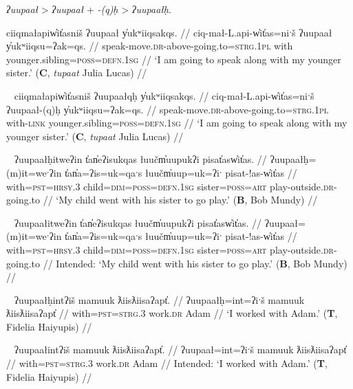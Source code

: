 \textit{ʔuupaał} > \textit{ʔuupaał} + \textit{-(q)ḥ} > \textit{ʔuupaałḥ}.

\ex \label{ex:uupaal1}
\begingl
\glpreamble ciiqmałapiw̓it̓asniš ʔuupaał y̓ukʷiiqsakqs. //
\gla ciq-mał-L.api-w̓it̓as=niˑš ʔuupaał y̓ukʷiiqsu=ʔak=qs. //
\glb speak-move.\textsc{dr}-above-going.to=\textsc{strg.1pl} with younger.sibling=\textsc{poss}=\textsc{defn.1sg} //
\glft `I am going to speak along with my younger sister.' (\textbf{C}, \textit{tupaat} Julia Lucas) //
\endgl
\xe

\ex~ \label{ex:uupaalqh1}
\begingl
\glpreamble ciiqmałapiw̓it̓asniš ʔuupaałqḥ y̓ukʷiiqsakqs. //
\gla ciq-mał-L.api-w̓it̓as=niˑš ʔuupaał-(q)ḥ y̓ukʷiiqsu=ʔak=qs. //
\glb speak-move.\textsc{dr}-above-going.to=\textsc{strg.1pl} with-\textsc{link} younger.sibling=\textsc{poss}=\textsc{defn.1sg} //
\glft `I am going to speak along with my younger sister.' (\textbf{C}, \textit{tupaat} Julia Lucas) //
\endgl
\xe

\ex~ \label{ex:uupaalh2}
\begingl
\glpreamble ʔuupaałḥitweʔin t̓an̓eʔisukqas łuučm̓uupukʔi pisat̓asw̓it̓as. //
\gla ʔuupaałḥ=(m)it=weˑʔin t̓an̓a=ʔis=uk=qaˑs łuučm̓uup=uk=ʔiˑ pisat-!as-w̓it̓as //
\glb with=\textsc{pst}=\textsc{hrsy.3} child=\textsc{dim}=\textsc{poss}=\textsc{defn.1sg} sister=\textsc{poss}=\textsc{art} play-outside.\textsc{dr}-going.to //
\glft `My child went with his sister to go play.' (\textbf{B}, Bob Mundy) //
\endgl
\xe

\ex~ \label{ex:*uupaal2}
\begingl
\glpreamble *ʔuupaałitweʔin t̓an̓eʔisukqas łuučm̓uupukʔi pisat̓asw̓it̓as. //
\gla ʔuupaał=(m)it=weˑʔin t̓an̓a=ʔis=uk=qaˑs łuučm̓uup=uk=ʔiˑ pisat-!as-w̓it̓as //
\glb with=\textsc{pst}=\textsc{hrsy.3} child=\textsc{dim}=\textsc{poss}=\textsc{defn.1sg} sister=\textsc{poss}=\textsc{art} play-outside.\textsc{dr}-going.to //
\glft Intended: `My child went with his sister to go play.' (\textbf{B}, Bob Mundy) //
\endgl
\xe

\ex~ \label{ex:uupaalh3}
\begingl
\glpreamble ʔuupaałḥintʔiš mamuuk ƛiisƛiisaʔapt̓. //
\gla ʔuupaałḥ=int=ʔiˑš mamuuk ƛiisƛiisaʔapt̓ //
\glb with=\textsc{pst}=\textsc{strg.3} work.\textsc{dr} Adam //
\glft `I worked with Adam.' (\textbf{T}, Fidelia Haiyupis) //
\endgl
\xe

\ex~ \label{ex:*uupaal3}
\begingl
\glpreamble *ʔuupaałintʔiš mamuuk ƛiisƛiisaʔapt̓. //
\gla ʔuupaał=int=ʔiˑš mamuuk ƛiisƛiisaʔapt̓ //
\glb with=\textsc{pst}=\textsc{strg.3} work.\textsc{dr} Adam //
\glft Intended: `I worked with Adam.' (\textbf{T}, Fidelia Haiyupis) //
\endgl
\xe

